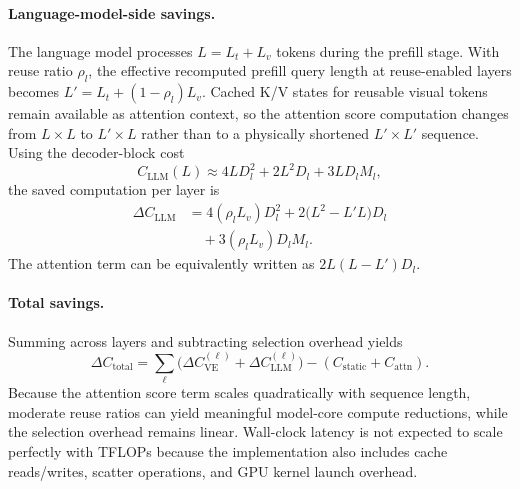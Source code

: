 \documentclass[11pt]{article}
\begin{document}
\paragraph{Language-model-side savings.}
The language model processes $L=L_t+L_v$ tokens during the prefill stage. With reuse ratio $\rho_l$, the effective recomputed prefill query length at reuse-enabled layers becomes $L' = L_t + (1-\rho_l)L_v$.
Cached K/V states for reusable visual tokens remain available as attention context, so the attention score computation changes from $L\times L$ to $L' \times L$ rather than to a physically shortened $L' \times L'$ sequence.
Using the decoder-block cost
\begin{equation}
    C_{\text{LLM}}(L) \approx 4 L D_l^2 + 2 L^2 D_l + 3 L D_l M_l,
    \label{eq:llm_flops}
\end{equation}
the saved computation per layer is
\begin{equation}
\label{eq:llm_savings}
\begin{split}
    \Delta C_{\text{LLM}} &= 4(\rho_l L_v)D_l^2
    + 2\big(L^2 - L' L\big)D_l \\
    &\quad + 3(\rho_l L_v)D_l M_l.
\end{split}
\end{equation}
The attention term can be equivalently written as $2L(L-L')D_l$.

\paragraph{Total savings.}
Summing across layers and subtracting selection overhead yields
\begin{equation}
    \Delta C_{\text{total}} =
    \sum_{\ell} \big(\Delta C_{\text{VE}}^{(\ell)} + \Delta C_{\text{LLM}}^{(\ell)}\big)
    - (C_{\text{static}} + C_{\text{attn}}).
    \label{eq:total_savings}
\end{equation}
Because the attention score term scales quadratically with sequence length, moderate reuse ratios can yield meaningful model-core compute reductions, while the selection overhead remains linear. Wall-clock latency is not expected to scale perfectly with TFLOPs because the implementation also includes cache reads/writes, scatter operations, and GPU kernel launch overhead.
\end{document}
